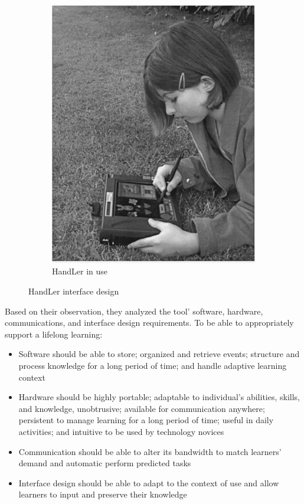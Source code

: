 \begin{figure}[!hbt]
\begin{subfigure}{0.35\textwidth}
\includegraphics[width= \textwidth]{lifelong3}
\caption{HandLer in use}
\end{subfigure}
\caption{HandLer interface design \cite{sharples2000design}}
\end{figure}

Based on their observation, they analyzed the tool' software, hardware, communications, and interface design requirements. To be able to appropriately support a lifelong learning: 
\begin{itemize}
\item Software should be able to store; organized and retrieve events; structure and process knowledge for a long period of time; and handle adaptive learning context
\item Hardware should be highly portable; adaptable to individual's abilities, skills, and knowledge, unobtrusive; available for communication anywhere; persistent to manage learning for a long period of time; useful in daily activities; and intuitive to be used by technology novices
\item Communication should be able to alter its bandwidth to match learners' demand and automatic perform predicted tasks 
\item Interface design should be able to adapt to the context of use and allow learners to input and preserve their knowledge
\end{itemize}

